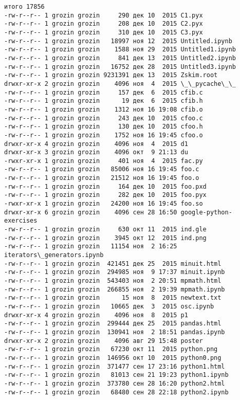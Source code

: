     \begin{Verbatim}[commandchars=\\\{\}]
итого 17856
-rw-r--r-- 1 grozin grozin     290 дек 10  2015 C1.pyx
-rw-r--r-- 1 grozin grozin     208 дек 10  2015 C2.pyx
-rw-r--r-- 1 grozin grozin     310 дек 10  2015 C3.pyx
-rw-r--r-- 1 grozin grozin   18997 ноя 12  2015 Untitled.ipynb
-rw-r--r-- 1 grozin grozin    1588 ноя 29  2015 Untitled1.ipynb
-rw-r--r-- 1 grozin grozin     841 дек 13  2015 Untitled2.ipynb
-rw-r--r-- 1 grozin grozin   16752 дек 28  2015 Untitled3.ipynb
-rw-r--r-- 1 grozin grozin 9231391 дек 13  2015 Zskim.root
drwxr-xr-x 2 grozin grozin    4096 ноя  4  2015 \_\_pycache\_\_
-rw-r--r-- 1 grozin grozin     157 дек  6  2015 cfib.c
-rw-r--r-- 1 grozin grozin      19 дек  6  2015 cfib.h
-rw-r--r-- 1 grozin grozin    1312 ноя 16 19:08 cfib.o
-rw-r--r-- 1 grozin grozin     243 дек 10  2015 cfoo.c
-rw-r--r-- 1 grozin grozin     130 дек 10  2015 cfoo.h
-rw-r--r-- 1 grozin grozin    1752 ноя 16 19:45 cfoo.o
drwxr-xr-x 4 grozin grozin    4096 ноя  4  2015 d1
drwxr-xr-x 3 grozin grozin    4096 окт  9 21:13 du
-rwxr-xr-x 1 grozin grozin     401 ноя  4  2015 fac.py
-rw-r--r-- 1 grozin grozin   85006 ноя 16 19:45 foo.c
-rw-r--r-- 1 grozin grozin   21512 ноя 16 19:45 foo.o
-rw-r--r-- 1 grozin grozin     164 дек 10  2015 foo.pxd
-rw-r--r-- 1 grozin grozin     282 дек 10  2015 foo.pyx
-rwxr-xr-x 1 grozin grozin   24200 ноя 16 19:45 foo.so
drwxr-xr-x 6 grozin grozin    4096 сен 28 16:50 google-python-exercises
-rw-r--r-- 1 grozin grozin     630 окт 11  2015 ind.gle
-rw-r--r-- 1 grozin grozin    3945 окт 12  2015 ind.png
-rw-r--r-- 1 grozin grozin   11154 ноя  2 16:25 iterators\_generators.ipynb
-rw-r--r-- 1 grozin grozin  421451 дек 25  2015 minuit.html
-rw-r--r-- 1 grozin grozin  294985 ноя  9 17:37 minuit.ipynb
-rw-r--r-- 1 grozin grozin  543403 ноя  2 20:51 mpmath.html
-rw-r--r-- 1 grozin grozin  266855 ноя  2 19:39 mpmath.ipynb
-rw-r--r-- 1 grozin grozin      15 ноя  8  2015 newtext.txt
-rw-r--r-- 1 grozin grozin   10665 дек  3  2015 osc.ipynb
drwxr-xr-x 4 grozin grozin    4096 ноя  8  2015 p1
-rw-r--r-- 1 grozin grozin  299444 дек 25  2015 pandas.html
-rw-r--r-- 1 grozin grozin  130941 ноя  2 18:51 pandas.ipynb
drwxr-xr-x 2 grozin grozin    4096 авг 29 15:48 poster
-rw-r--r-- 1 grozin grozin   67230 окт 11  2015 python.png
-rw-r--r-- 1 grozin grozin  146956 окт 10  2015 python0.png
-rw-r--r-- 1 grozin grozin  371477 сен 17 23:16 python1.html
-rw-r--r-- 1 grozin grozin   81013 сен 21 19:23 python1.ipynb
-rw-r--r-- 1 grozin grozin  373780 сен 28 16:20 python2.html
-rw-r--r-- 1 grozin grozin   68480 сен 28 22:18 python2.ipynb

\end{Verbatim}
